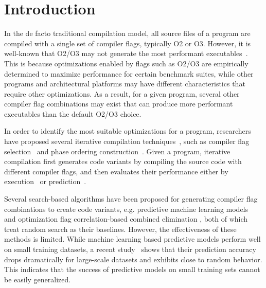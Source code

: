 \vspace{-2ex}
\section{Introduction}
In the de facto traditional compilation model, all source files of a program are
compiled with a single set of compiler flags, typically O2 or O3.
However, it is well-known that O2/O3 may not generate the most
performant executables~\cite{Chen:2010:EIO:1806596.1806647}. This is
because optimizations enabled by flags such as O2/O3 are empirically
determined to maximize performance for certain benchmark suites, while
other programs and architectural platforms may have different
characteristics that require other optimizations.  As a result, for a
given program, several other compiler flag combinations may exist that
can produce more performant executables than the default O2/O3 choice.

In order to identify the most suitable optimizations for a program,
researchers have proposed several iterative compilation
techniques~\cite{iterativecompilation,1191546,1611551}, such as
compiler flag selection~\cite{Chen:2010:EIO:1806596.1806647,Cavazos:2007:RSG:1251974.1252540,Vaswani:2007:MSE:1251974.1252536}
and phase ordering construction~\cite{Kulkarni:2004:FSE:996841.996863,Nobre:2016:GIC:2907950.2907959,6662511}.  Given a program, iterative
compilation first generates code variants by compiling the source code
with different compiler flags, and then evaluates their performance
either by execution~\cite{1611551,Chen:2010:EIO:1806596.1806647} or
prediction~\cite{Cavazos:2007:RSG:1251974.1252540,cere}.

Several search-based algorithms have been proposed for generating
compiler flag combinations to create code variants, e.g. predictive machine
learning models~\cite{Cavazos:2007:RSG:1251974.1252540} and
optimization flag correlation-based combined elimination
\cite{1611551}, both of which treat random search
\cite{Chen:2010:EIO:1806596.1806647,opentuner,1611551} as their
baselines.  However, the effectiveness of these methods is limited.
While machine learning based predictive models
\cite{Cavazos:2007:RSG:1251974.1252540} perform well on small training
datasets, a recent study~\cite{FursinMGL15}  shows that their prediction accuracy
drops dramatically for large-scale datasets and exhibits close to
random behavior.  This indicates that the success of predictive models
on small training sets cannot be easily generalized.

